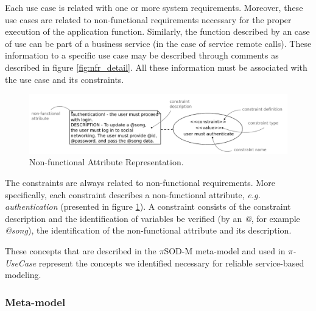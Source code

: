 Each use case is related with one or more system requirements. Moreover, these
use cases are related to non-functional requirements necessary for the proper
execution of the application function. Similarly, the function described by an
case of use can be part of a business service (in the case of service remote
calls). These information to a specific use case may be described through
comments as described in figure \ref{fig:nfr_detail}. All these information
must be associated with the use case and its constraints.
 
 \begin{figure}[ht!] 
\centering
\includegraphics[width=.85\textwidth]{chapters/methodology/figs/nfa_detail.pdf}
\caption{Non-functional Attribute Representation.}
\label{fig:nfa_detail} 
\end{figure}

The constraints are always related to non-functional requirements. More
specifically, each constraint describes a non-functional attribute,
\textit{e.g.} \textit{authentication} (presented in figure
\ref{fig:nfa_detail}). A constraint consists of the constraint description and
the identification of variables be verified (by an \textit{@}, for example
\textit{@song}), the identification of the non-functional attribute and its
description. 

  


These concepts that are described in the $\pi$SOD-M  meta-model and used in
\textit{$\pi$-UseCase} represent the concepts we identified necessary
for reliable service-based modeling. 

%  
%  
 
 \subsubsection{Meta-model} 
 
